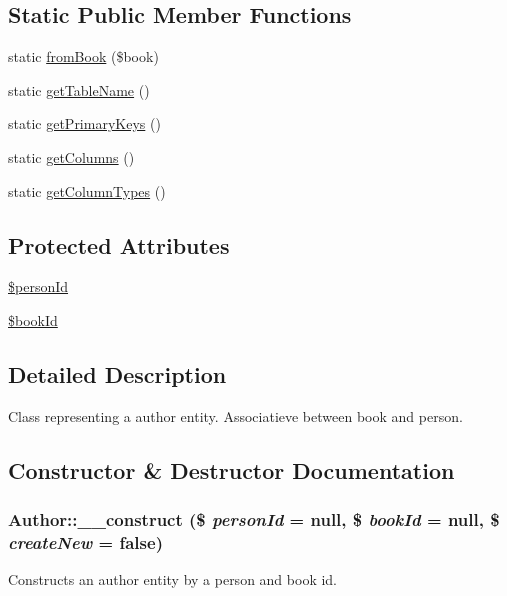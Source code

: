 \subsection*{Static Public Member Functions}
\begin{DoxyCompactItemize}
\item 
static \hyperlink{classAuthor_a28e3a2452148b8099d0075d88bf21b66}{fromBook} (\$book)
\item 
static \hyperlink{classAuthor_a83c8f19c169bcfffb4e0df09fadafe26}{getTableName} ()
\item 
static \hyperlink{classAuthor_abeb5bf2d5739d0e46522c608c04db776}{getPrimaryKeys} ()
\item 
static \hyperlink{classAuthor_aa3e40fdf422c171a8e307725ca5ff05c}{getColumns} ()
\item 
static \hyperlink{classAuthor_a305006a9a8889149f9103b1c5d762aa9}{getColumnTypes} ()
\end{DoxyCompactItemize}
\subsection*{Protected Attributes}
\begin{DoxyCompactItemize}
\item 
\hyperlink{classAuthor_a628d54cd75c03cfe5c48c38fbabaf391}{\$personId}
\item 
\hyperlink{classAuthor_a6d4bc8d9eae2f9d89654bece0c0f9522}{\$bookId}
\end{DoxyCompactItemize}


\subsection{Detailed Description}
Class representing a author entity. Associatieve between book and person. 

\subsection{Constructor \& Destructor Documentation}
\hypertarget{classAuthor_ad0dc0fef1570b45b600c990053adeb36}{
\subsubsection[{\_\-\_\-construct}]{\setlength{\rightskip}{0pt plus 5cm}Author::\_\-\_\-construct (\$ {\em personId} = {\ttfamily null}, \/  \$ {\em bookId} = {\ttfamily null}, \/  \$ {\em createNew} = {\ttfamily false})}}
\label{classAuthor_ad0dc0fef1570b45b600c990053adeb36}
Constructs an author entity by a person and book id.


